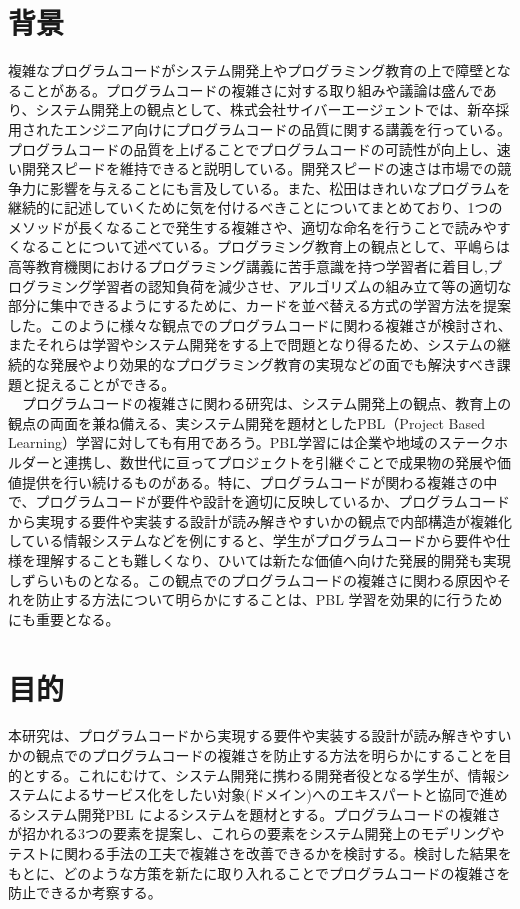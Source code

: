 \documentclass[12pt, a4paper]{jreport}
\begin{document}
    \section{背景}
    複雑なプログラムコードがシステム開発上やプログラミング教育の上で障壁となることがある。プログラムコードの複雑さに対する取り組みや議論は盛んであり、システム開発上の観点として、株式会社サイバーエージェント\cite{CyberZ}では、新卒採用されたエンジニア向けにプログラムコードの品質に関する講義を行っている。プログラムコードの品質を上げることでプログラムコードの可読性が向上し、速い開発スピードを維持できると説明している。開発スピードの速さは市場での競争力に影響を与えることにも言及している。また、松田\cite{kireina}はきれいなプログラムを継続的に記述していくために気を付けるべきことについてまとめており、1つのメソッドが長くなることで発生する複雑さや、適切な命名を行うことで読みやすくなることについて述べている。プログラミング教育上の観点として、平嶋ら\cite{haikei}は高等教育機関におけるプログラミング講義に苦手意識を持つ学習者に着目し,プログラミング学習者の認知負荷を減少させ、アルゴリズムの組み立て等の適切な部分に集中できるようにするために、カードを並べ替える方式の学習方法を提案した。このように様々な観点でのプログラムコードに関わる複雑さが検討され、またそれらは学習やシステム開発をする上で問題となり得るため、システムの継続的な発展やより効果的なプログラミング教育の実現などの面でも解決すべき課題と捉えることができる。
    \\　プログラムコードの複雑さに関わる研究は、システム開発上の観点、教育上の観点の両面を兼ね備える、実システム開発を題材としたPBL（Project Based Learning）学習に対しても有用であろう。PBL学習には企業や地域のステークホルダーと連携し、数世代に亘ってプロジェクトを引継ぐことで成果物の発展や価値提供を行い続けるものがある。特に、プログラムコードが関わる複雑さの中で、プログラムコードが要件や設計を適切に反映しているか、プログラムコードから実現する要件や実装する設計が読み解きやすいかの観点で内部構造が複雑化している情報システムなどを例にすると、学生がプログラムコードから要件や仕様を理解することも難しくなり、ひいては新たな価値へ向けた発展的開発も実現しずらいものとなる。この観点でのプログラムコードの複雑さに関わる原因やそれを防止する方法について明らかにすることは、PBL 学習を効果的に行うためにも重要となる。
\section{目的}
本研究は、プログラムコードから実現する要件や実装する設計が読み解きやすいかの観点でのプログラムコードの複雑さを防止する方法を明らかにすることを目的とする。これにむけて、システム開発に携わる開発者役となる学生が、情報システムによるサービス化をしたい対象(ドメイン)へのエキスパートと協同で進めるシステム開発PBL によるシステムを題材とする。プログラムコードの複雑さが招かれる3つの要素を提案し、これらの要素をシステム開発上のモデリングやテストに関わる手法の工夫で複雑さを改善できるかを検討する。検討した結果をもとに、どのような方策を新たに取り入れることでプログラムコードの複雑さを防止できるか考察する。
\end{document}

